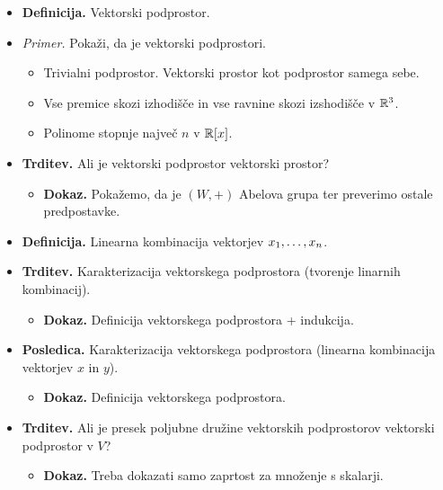 \begin{enumerate}
\begin{itemize}
\begin{itemize}
            (4) Uporabimo lastnosti polja z predpostavko, da $\alpha \neq 0$.
        \end{itemize}
        \item \colorbox{purple!30}{\textbf{Definicija.}} Vektorski podprostor.
        \item \colorbox{yellow!30}{\emph{Primer.}} Pokaži, da je vektorski podprostori.        
            \begin{itemize}
                \item Trivialni podprostor. Vektorski prostor kot podprostor samega sebe.
                \item  Vse premice skozi izhodišče in vse ravnine skozi izshodišče v $\mathbb{R}^3$.
                \item  Polinome stopnje največ $n$ v $\mathbb{R}[x]$.
            \end{itemize}
        \item \colorbox{blue!30}{\textbf{Trditev.}} Ali je vektorski podprostor vektorski prostor?
        \begin{itemize}
            \item \colorbox{green!30}{\textbf{Dokaz.}} Pokažemo, da je $(W, +)$ Abelova grupa ter preverimo ostale predpostavke.
        \end{itemize}
        \item \colorbox{purple!30}{\textbf{Definicija.}} Linearna kombinacija vektorjev $x_1, \ldots, x_{n}$.
        \item \colorbox{blue!30}{\textbf{Trditev.}} Karakterizacija vektorskega podprostora (tvorenje linarnih kombinacij).
        \begin{itemize}
            \item \colorbox{green!30}{\textbf{Dokaz.}} Definicija vektorskega podprostora + indukcija.
        \end{itemize}
        \item \colorbox{orange!30}{\textbf{Posledica.}} Karakterizacija vektorskega podprostora (linearna kombinacija vektorjev $x$ in $y$).
        \begin{itemize}
            \item \colorbox{green!30}{\textbf{Dokaz.}} Definicija vektorskega podprostora.
        \end{itemize}
        \item \colorbox{blue!30}{\textbf{Trditev.}} Ali je presek poljubne družine vektorskih podprostorov vektorski podprostor v $V$?
        \begin{itemize}
            \item \colorbox{green!30}{\textbf{Dokaz.}} Treba dokazati samo zaprtost za množenje s skalarji.

\end{itemize}
\end{itemize}
\end{enumerate}
